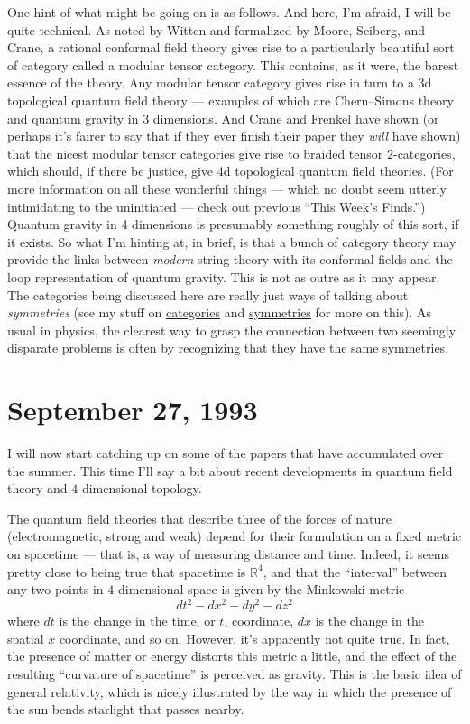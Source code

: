 \documentclass[12pt]{article}
\begin{document}
One hint of what might be going on is as follows. And here, I'm afraid,
I will be quite technical. As noted by Witten and formalized by Moore,
Seiberg, and Crane, a rational conformal field theory gives rise to a
particularly beautiful sort of category called a modular tensor
category. This contains, as it were, the barest essence of the theory.
Any modular tensor category gives rise in turn to a 3d topological
quantum field theory --- examples of which are Chern--Simons theory and
quantum gravity in 3 dimensions. And Crane and Frenkel have shown (or
perhaps it's fairer to say that if they ever finish their paper they
\emph{will} have shown) that the nicest modular tensor categories give
rise to braided tensor \(2\)-categories, which should, if there be
justice, give 4d topological quantum field theories. (For more
information on all these wonderful things --- which no doubt seem
utterly intimidating to the uninitiated --- check out previous ``This
Week's Finds.'') Quantum gravity in 4 dimensions is presumably something
roughly of this sort, if it exists. So what I'm hinting at, in brief, is
that a bunch of category theory may provide the links between
\emph{modern} string theory with its conformal fields and the loop
representation of quantum gravity. This is not as outre as it may
appear. The categories being discussed here are really just ways of
talking about \emph{symmetries} (see my stuff on
\href{http://math.ucr.edu/home/baez/categories.html}{categories} and
\href{http://math.ucr.edu/home/baez/symmetries.html}{symmetries} for
more on this). As usual in physics, the clearest way to grasp the
connection between two seemingly disparate problems is often by
recognizing that they have the same symmetries.



\hypertarget{week19}{%
\section{September 27, 1993}\label{week19}}

I will now start catching up on some of the papers that have accumulated
over the summer. This time I'll say a bit about recent developments in
quantum field theory and \(4\)-dimensional topology.

The quantum field theories that describe three of the forces of nature
(electromagnetic, strong and weak) depend for their formulation on a
fixed metric on spacetime --- that is, a way of measuring distance and
time. Indeed, it seems pretty close to being true that spacetime is
\(\mathbb{R}^4\), and that the ``interval'' between any two points in
\(4\)-dimensional space is given by the Minkowski metric
\[dt^2 -dx^2 -dy^2 -dz^2\] where \(dt\) is the change in the time, or
\(t\), coordinate, \(dx\) is the change in the spatial \(x\) coordinate,
and so on. However, it's apparently not quite true. In fact, the
presence of matter or energy distorts this metric a little, and the
effect of the resulting ``curvature of spacetime'' is perceived as
gravity. This is the basic idea of general relativity, which is nicely
illustrated by the way in which the presence of the sun bends starlight
that passes nearby.
\end{document}
